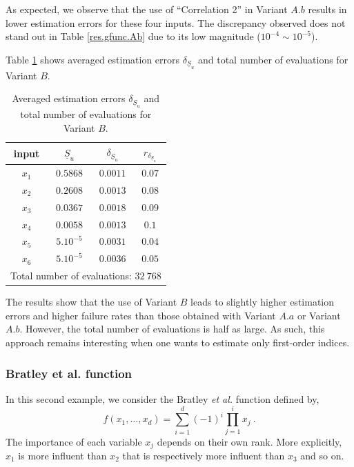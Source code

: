 As expected, we observe that the use of ``Correlation 2'' in Variant $A.b$ results in lower estimation errors for these four inputs. The discrepancy observed does not stand out in Table \ref{res.gfunc.Ab} due to its low magnitude ($10^{-4} \sim 10^{-5}$).
\bigskip

Table \ref{res.gfunc.B} shows averaged estimation errors $\delta_{\underline{S}_u}$ and total number of evaluations for Variant $B$. 
\begin{table}[!ht]
\caption{Averaged estimation errors $\delta_{\underline{S}_u}$ and total number of evaluations for Variant $B$.}
\centering
\begin{tabular}{cccc}
\hline
 input & $\underline{S}_u$ & $\delta_{\underline{S}_u}$ & $r_{\delta_{\underline{S}_u}}$ \\ \hline
 $x_1$ & $0.5868$ &  $0.0011$ & $0.07$ \\ \hline
 $x_2$ & $0.2608$ &  $0.0013$ & $0.08$ \\ \hline
 $x_3$ & $0.0367$ &  $0.0018$ & $0.09$ \\ \hline
 $x_4$ & $0.0058$ &  $0.0013$ & $0.1$    \\ \hline
 $x_5$ & $5.10^{-5}$ & $0.0031$ & $0.04$  \\ \hline
 $x_6$ & $5.10^{-5}$ & $0.0036$ & $0.05$  \\ \hline \hline
\multicolumn{4}{l}{Total number of evaluations: $32 \ 768$}\\ \hline 
\end{tabular}
\label{res.gfunc.B}
\end{table}
The results show that the use of Variant $B$ leads to slightly higher estimation errors and higher failure rates than those obtained with Variant $A.a$ or Variant $A.b$. However, the total number of evaluations is {\color{purple}half as large}. As such, this approach remains interesting when one wants to estimate only first-order indices.

\subsubsection{Bratley et al. function}

In this second example, we consider the Bratley \textit{et al.} function defined by,
$$f(x_1,\dots,x_d)=\sum \limits_{i=1}^{d} (-1)^i \prod \limits_{j=1}^{i} x_j \ .$$
The importance of each variable $x_j$ depends on their own rank. More explicitly, $x_1$ is more influent than $x_2$ that is respectively more influent than $x_3$ and so on. 

